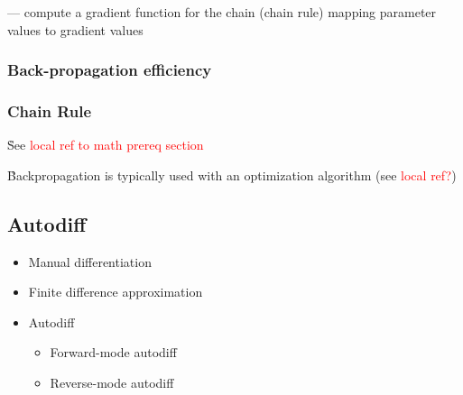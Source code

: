 





\r{ --- compute a gradient function for the chain (chain rule) mapping parameter values to gradient values}

\subsubsection{Back-propagation efficiency}


\subsubsection{Chain Rule}

\r{See \textcolor{red}{local ref to math prereq section}}


\r{Backpropagation is typically used with an optimization algorithm (see \textcolor{red}{local ref?})}

\subsection{Autodiff}


\begin{itemize}[noitemsep,topsep=0pt]
	\item Manual differentiation
	\item Finite difference approximation
	\item Autodiff
	\begin{itemize}[noitemsep,topsep=0pt]
		\item Forward-mode autodiff
		\item Reverse-mode autodiff
	\end{itemize}
\end{itemize}



